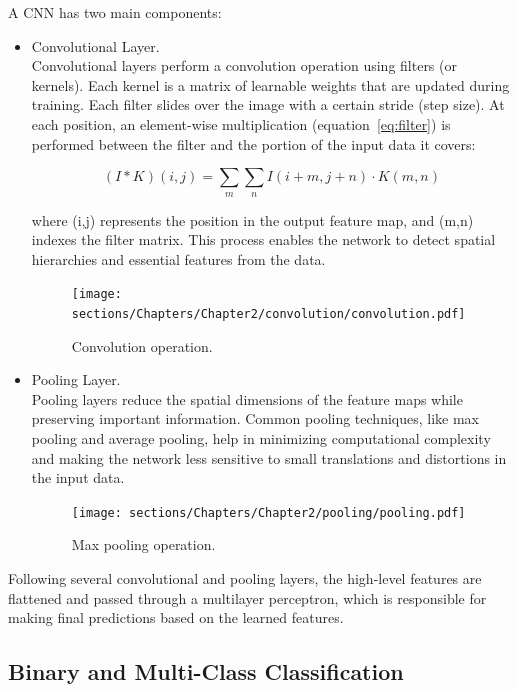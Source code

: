 A CNN has two main components:

\begin{itemize}
    \item Convolutional Layer.\\
    Convolutional layers perform a convolution operation using filters (or kernels).
    Each kernel is a matrix of learnable weights that are updated during training.
    Each filter slides over the image with a certain stride (step size). At each position, 
    an element-wise multiplication (equation~\ref{eq:filter}) is performed between the filter and the portion of the input data it covers:

    \begin{equation}
        (I * K)(i,j)= \sum_m \sum_n I(i+m,j+n) \cdot K(m,n)
    \label{eq:filter}
    \end{equation}

    where (i,j) represents the position in the output feature map, and (m,n) indexes the filter matrix.
    This process enables the network to detect spatial hierarchies and essential features from the data.

    \begin{figure}[h]
    \centering
    \texttt{[image: sections/Chapters/Chapter2/convolution/convolution.pdf]}
    \caption{Convolution operation.}
    \end{figure}

    \item Pooling Layer.\\
    Pooling layers reduce the spatial dimensions of the feature maps while preserving important information. Common pooling techniques, 
    like max pooling and average pooling, help in minimizing computational complexity and making the network less sensitive to small translations 
    and distortions in the input data.

    \begin{figure}[h]
    \centering
    \texttt{[image: sections/Chapters/Chapter2/pooling/pooling.pdf]}
    \caption{Max pooling operation.}
    \end{figure}
\end{itemize}

Following several convolutional and pooling layers, the high-level features are flattened and passed through a multilayer perceptron, which is
responsible for making final predictions based on the learned features.


\subsection{Binary and Multi-Class Classification}

